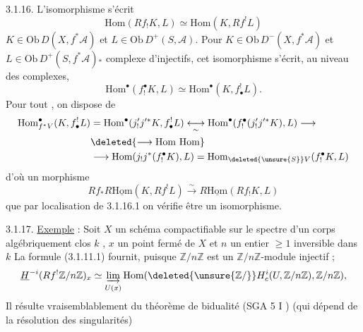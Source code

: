 3.1.16. L'isomorphisme  s'écrit
\[
 \mathrm{Hom}(Rf_!K,L)\simeq\mathrm{Hom}(K,Rf^!L)
 \tag*{(3.1.16.1)}
\]
 \deleted{\{} $K\in\mathrm{Ob}\,D(X,f^*\mathcal A)$ et $L\in\mathrm{Ob}\,D^+(S,\mathcal A)$. \deleted{\}} Pour $K\in\mathrm{Ob}\,D^-(X,f^*\mathcal A)$ et $L\in\mathrm{Ob}\,D^+(S,f^*\mathcal A)$\ensuremath{{}_{*}}  complexe d'injectifs, cet isomorphisme s'écrit, au niveau des complexes,
\[
 \mathrm{Hom}^\bullet(f_!^\bullet K,L)\simeq
 \mathrm{Hom}^\bullet(K,f_\bullet^!L).
\]
Pour tout , on dispose de
\[
\begin{aligned}
 \mathrm{Hom}_{f^*V}^\bullet(K,f_\bullet^!L)
 &=\mathrm{Hom}^\bullet(j'_!j'^*K,f_\bullet^!L)
 \underset{\sim}{\longleftrightarrow}\mathrm{Hom}^\bullet(f_!^\bullet(j'_!j'^*K),L)\longrightarrow\\
 &\deleted{\longrightarrow\mathrm{Hom}\ \mathrm{Hom}}\\
 &\longrightarrow\mathrm{Hom}(j_!j^*(f_!^\bullet K),L)
 =\mathrm{Hom}_{\deleted{\unsure{S}}V}(f_!^\bullet K,L)
\end{aligned}
\]
d'où un morphisme
\[
 Rf_*R\underline{\mathrm{Hom}}(K,Rf^!L)\xrightarrow{\sim}
 R\underline{\mathrm{Hom}}(Rf_!K,L)
 \tag*{(3.1.16.2)}
\]
que par localisation de 3.1.16.1 on vérifie être un isomorphisme.

3.1.17. \uline{Exemple} :
Soit $X$ un schéma compactifiable sur le spectre d'un corps algébriquement clos $k$ , $x$ un point fermé de $X$ et $n$ un entier $\geq1$ inversible dans $k$ La formule (3.1.11.1) fournit, puisque $\mathbb Z/n\mathbb Z$ est un $\mathbb Z/n\mathbb Z$-module injectif ; 
\[
 \underline H^{-i}(Rf^!\mathbb Z/n\mathbb Z)_x
 \simeq\underset{U(x)}{\underrightarrow{\lim}}\,
 \mathrm{Hom}(\deleted{\unsure{\mathbb Z/}}H_c^i(U,\mathbb Z/n\mathbb Z),\mathbb Z/n\mathbb Z),
\]
Il résulte vraisemblablement du théorème de bidualité (SGA 5 I \qquad) (qui dépend de la résolution des singularités)
